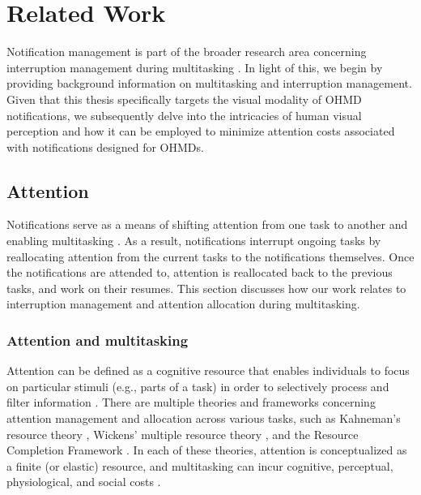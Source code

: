 
\chapter{Related Work}
\label{ch:Relatedwork}

Notification management is part of the broader research area concerning interruption management during multitasking \cite{anderson_survey_2018, mehrotra_intelligent_2018}. In light of this, we begin by providing background information on multitasking and interruption management. Given that this thesis specifically targets the visual modality of OHMD notifications, we subsequently delve into the intricacies of human visual perception and how it can be employed to minimize attention costs associated with notifications designed for OHMDs.





\section{Attention}
\label{sec:Relatedwork:multitasking_interruption}


Notifications serve as a means of shifting attention from one task to another and enabling multitasking \cite{iqbal_notifications_2010, norman_psychological_1986, anderson_survey_2018}. As a result, notifications interrupt ongoing tasks by reallocating attention from the current tasks to the notifications themselves. Once the notifications are attended to, attention is reallocated back to the previous tasks, and work on their resumes. This section discusses how our work relates to interruption management and attention allocation during multitasking.


\subsection{Attention and multitasking}
\label{sec:Relatedwork:attention}


Attention can be defined as a cognitive resource that enables individuals to focus on particular stimuli (e.g., parts of a task) in order to selectively process and filter information \cite{wickens_attention_2013, apa_attention_2021}. There are multiple theories and frameworks concerning attention management and allocation across various tasks, such as Kahneman's resource theory \cite{kahneman1973attention}, Wickens' multiple resource theory \cite{wickens_processing_1991}, and the Resource Completion Framework \cite{oulasvirta_interaction_2005}. In each of these theories, attention is conceptualized as a finite (or elastic) resource, and multitasking can incur cognitive, perceptual, physiological, and social costs \cite{wobbrock_situationally_2019, oulasvirta_interaction_2005}.


